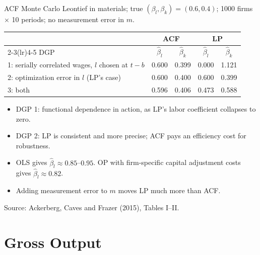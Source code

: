 \documentclass[aspectratio=169,10pt]{beamer}
\begin{document}
\begin{frame}{ACF Monte Carlo}
\small
Leontief in materials; true $(\beta_l, \beta_k) = (0.6, 0.4)$; 1000 firms $\times$ 10 periods; no measurement error in $m$.
\begin{center}
\renewcommand{\arraystretch}{1.15}
\begin{tabular}{lcccc}
\toprule
& \multicolumn{2}{c}{ACF} & \multicolumn{2}{c}{LP} \\
\cmidrule(lr){2-3}\cmidrule(lr){4-5}
DGP & $\hat\beta_l$ & $\hat\beta_k$ & $\hat\beta_l$ & $\hat\beta_k$ \\
\midrule
1: serially correlated wages, $l$ chosen at $t-b$ & 0.600 & 0.399 & 0.000 & 1.121 \\
2: optimization error in $l$ (LP's case) & 0.600 & 0.400 & 0.600 & 0.399 \\
3: both & 0.596 & 0.406 & 0.473 & 0.588 \\
\bottomrule
\end{tabular}
\end{center}
\begin{itemize}
\item DGP 1: functional dependence in action, as LP's labor coefficient collapses to zero.
\item DGP 2: LP is consistent and more precise; ACF pays an efficiency cost for robustness.
\item OLS gives $\hat\beta_l \approx 0.85$--$0.95$. OP with firm-specific capital adjustment costs gives $\hat\beta_l \approx 0.82$.
\item Adding measurement error to $m$ moves LP much more than ACF.
\end{itemize}
{\footnotesize Source: Ackerberg, Caves and Frazer (2015), Tables I--II.}
\end{frame}


\section{Gross Output}
\end{document}
